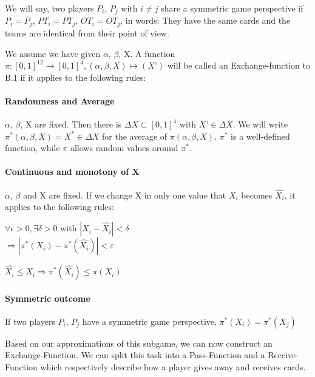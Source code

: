 \begin{definition}
We will say, two players $P_i$, $P_j$ with  $i \neq j$ share a symmetric game perspective if $P_i = P_j$, $PT_i = PT_j$, $OT_i = OT_j$, in words: They have the same cards and the teams are identical from their point of view. 
\end{definition}
\begin{definition}
We assume we have given $\alpha$, $\beta$, X. A function $\pi: [0,1]^{12} \to [0,1]^4, (\alpha, \beta, X) \mapsto (X’)$ will be called an Exchange-function to B.1  if it applies to the following rules:
\paragraph{Randomness and Average}
$\alpha$, $\beta$, X are fixed. Then there is $\Delta X \subset [0,1]^4$ with $X’ \in \Delta X$. We will write $\pi^* (\alpha, \beta, X) = X^* \in \Delta X$ for the average of $\pi(\alpha, \beta, X)$. $\pi^*$ is a well-defined function, while $\pi$ allows random values around $\pi^*$.
\paragraph{Continuous and monotony of X}
$\alpha$, $\beta$ and X are fixed. If we change X in only one value that $X_i$ becomes $\widehat{X_i}$, it applies to the following rules:
\begin{axioms}[(C1)]
\item $\forall \epsilon > 0, \exists \delta > 0$ with $| X_i - \widehat{X_i}| < \delta$ \\$\Rightarrow | \pi^*(X_i) - \pi^*(\widehat{X_i}) | < \varepsilon $
\item $\widehat{X_i} \leq X_i \Rightarrow \pi^*(\widehat{X_i}) \leq \pi(X_i)$
\end{axioms}

\paragraph{Symmetric outcome}
If two players $P_i$, $P_j$ have a symmetric game perspective, $\pi^*(X_i) = \pi^*(X_j)$
\end{definition}

Based on our approximations of this subgame, we can now construct an Exchange-Function. We can split this task into a Pass-Function and a Receive-Function which respectively describe how a player gives away and receives cards.

